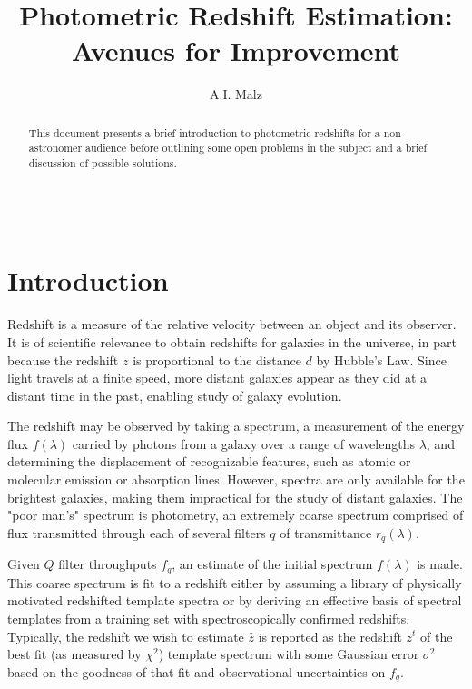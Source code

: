 \documentclass[12pt, onecolumn]{emulateapj}
\begin{document}
\begin{align}
\end{align}

\title{Photometric Redshift Estimation: Avenues for Improvement}

\author{A.I. Malz}

\begin{abstract}
This document presents a brief introduction to photometric redshifts for a non-astronomer audience before outlining some open problems in the subject and a brief discussion of possible solutions.
\end{abstract}


\section{Introduction}
\label{sec:intro}

Redshift is a measure of the relative velocity between an object and its observer.  It is of scientific relevance to obtain redshifts for galaxies in the universe, in part because the redshift $z$ is proportional to the distance $d$ by Hubble's Law.  Since light travels at a finite speed, more distant galaxies appear as they did at a distant time in the past, enabling study of galaxy evolution. 

The redshift may be observed by taking a spectrum, a measurement of the energy flux $f(\lambda)$ carried by photons from a galaxy over a range of wavelengths $\lambda$, and determining the displacement of recognizable features, such as atomic or molecular emission or absorption lines.  However, spectra are only available for the brightest galaxies, making them impractical for the study of distant galaxies.  The "poor man's" spectrum is photometry, an extremely coarse spectrum comprised of flux transmitted through each of several filters $q$ of transmittance $r_{q}(\lambda)$.

Given $Q$ filter throughputs $f_{q}$, an estimate of the initial spectrum $f(\lambda)$ is made.  This coarse spectrum is fit to a redshift either by assuming a library of physically motivated redshifted template spectra or by deriving an effective basis of spectral templates from a training set with spectroscopically confirmed redshifts.  Typically, the redshift we wish to estimate $\hat{z}$ is reported as the redshift $z^{t}$ of the best fit (as measured by $\chi^{2}$) template spectrum with some Gaussian error $\sigma^{2}$ based on the goodness of that fit and observational uncertainties on $f_{q}$.
\end{document}
